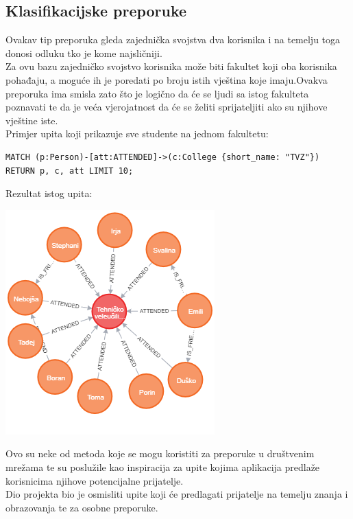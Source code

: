 \documentclass[titlepage, 12pt]{scrartcl}
\begin{document}
\subsection*{Klasifikacijske preporuke}
Ovakav tip preporuka gleda zajednička svojstva dva korisnika i na temelju toga donosi odluku tko je kome najsličniji. \\
Za ovu bazu zajedničko svojstvo korisnika može biti fakultet koji oba korisnika pohađaju, a moguće ih je poredati po broju istih vještina koje imaju.Ovakva preporuka ima smisla zato što je logično da će se ljudi sa istog fakulteta poznavati te da je veća vjerojatnost da će se želiti sprijateljiti ako su njihove vještine iste. \\
\newpage
Primjer upita koji prikazuje sve studente na jednom fakultetu:

\begin{samepage}
\begin{verbatim}
MATCH (p:Person)-[att:ATTENDED]->(c:College {short_name: "TVZ"})
RETURN p, c, att LIMIT 10;
\end{verbatim}
\end{samepage}

Rezultat istog upita:
\begin{center}
    \includegraphics[scale=0.7]{slike/same_college.png}
\end{center}

Ovo su neke od metoda koje se mogu koristiti za preporuke u društvenim mrežama te su poslužile kao inspiracija za upite kojima aplikacija predlaže korisnicima njihove potencijalne prijatelje. \\
Dio projekta bio je osmisliti upite koji će predlagati prijatelje na temelju znanja i obrazovanja te za osobne preporuke.
\end{document}
